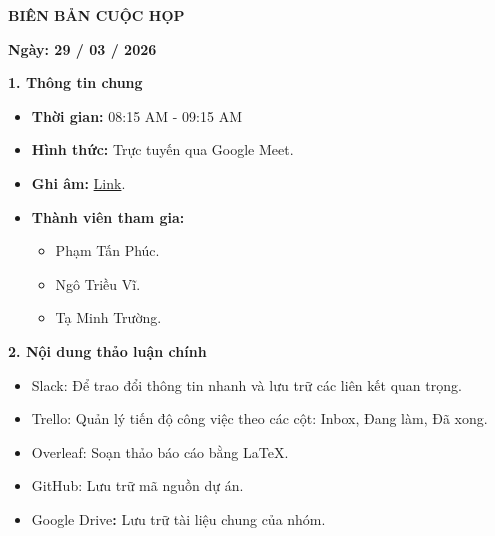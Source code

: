 \documentclass[12pt,a4paper]{article}
\begin{document}


\setlength{\parindent}{0pt}
\setlength{\parskip}{0pt}
\singlespacing

\begin{center}
    {\large\bfseries BIÊN BẢN CUỘC HỌP}
\end{center}
\begin{center}
    \textbf{Ngày: 29 / 03 / 2026}
\end{center}
\vspace{0.4em}

\textbf{1. Thông tin chung}
\begin{itemize}
    \item \textbf{Thời gian:} 08:15 AM - 09:15 AM
    \item \textbf{Hình thức:} Trực tuyến qua Google Meet.
    \item \textbf{Ghi âm:} \href{https://drive.google.com/drive/folders/1C5ZCEFENvkdMgCJapc1XmjGW759TlHee}{Link}.
    \item \textbf{Thành viên tham gia:}
    \begin{itemize}
        \item Phạm Tấn Phúc.
        \item Ngô Triều Vĩ.
        \item Tạ Minh Trường.
    \end{itemize}
\end{itemize}

\textbf{2. Nội dung thảo luận chính}

\begin{itemize}[leftmargin=3.3em]
    \item[o] Slack: Để trao đổi thông tin nhanh và lưu trữ các liên kết quan trọng.
    \item[o] Trello: Quản lý tiến độ công việc theo các cột: Inbox, Đang làm, Đã xong.
    \item[o] Overleaf: Soạn thảo báo cáo bằng LaTeX.
    \item[o] GitHub: Lưu trữ mã nguồn dự án.
    \item[o] Google Drive\textbf{:} Lưu trữ tài liệu chung của nhóm.
\end{itemize}
\end{document}
